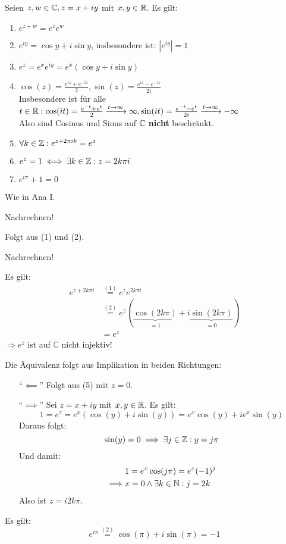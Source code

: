 \documentclass[a4paper,oneside,DIV15,BCOR12mm,chapterprefix=true,headings=onelinechapter]{scrbook}
\begin{document}
\begin{satz}
Seien $z,w\in\mathbb{C}, z=x+iy$ mit $x,y\in\mathbb{R}$. Es gilt:
\begin{enumerate}
\item $e^{z+w}=e^z e^w$
\item $e^{iy}=\cos y+i\sin y$, insbesondere ist: $|e^{iy}|=1$
\item $e^z=e^x e^{iy}=e^x(\cos y+i\sin y)$
\item $ \cos (z)=\frac{e^{iz}+e^{-iz}}{2}, \sin (z)=\frac{e^{iz}-e^{-iz}}{2i}$\\
Insbesondere ist für alle $t\in\mathbb{R}: \cos(it)=\frac{e^{-t}+e^t}{2} \xrightarrow{t \rightarrow \infty} \infty, 
\sin(it)=\frac{e^{-t}-e^t}{2i} \xrightarrow{t \rightarrow \infty} - \infty$\\
Also sind Cosinus und Sinus auf $\mathbb{C}$ \textbf{nicht} beschränkt.
\item $\forall k\in\mathbb{Z}:e^{z+2\pi i k}=e^z$
\item $e^z=1 \iff \exists k\in\mathbb{Z}:z=2k\pi i$
\item $e^{i\pi}+1=0$
\end{enumerate}
\end{satz}

\begin{beweise}
\item Wie in Ana I.
\item Nachrechnen!
\item Folgt aus (1) und (2).
\item Nachrechnen!
\item Es gilt:
\begin{align*}
e^{z+2k\pi i} &\stackrel{(1)}{=}e^ze^{2k\pi i}\\
&\stackrel{(2)}{=}e^z(\underbrace{\cos(2k\pi)}_{=1}+i\underbrace{\sin(2k\pi)}_{=0})\\
&= e^z
\end{align*}
$\Rightarrow e^z$ ist auf $\mathbb{C}$ nicht injektiv!
\item
Die Äquivalenz folgt aus Implikation in beiden Richtungen:
\begin{enumerate}
\item["`$\impliedby$"'] Folgt aus (5) mit $z=0$.
\item["`$\implies$"'] Sei $z=x+iy$ mit $x,y\in\mathbb{R}$. Es gilt:
\[1=e^z=e^x(\cos(y)+i\sin(y))=e^x\cos(y)+ie^x\sin(y)\]
Daraus folgt:
\[\sin(y)=0\implies \exists j\in\mathbb{Z}:y=j\pi\]
Und damit:
\begin{align*}
&1=e^x\cos(j\pi)=e^x(-1)^j\\
\implies &x=0\wedge\exists k\in\mathbb{N}: j=2k
\end{align*}
Also ist $z=i2k\pi$.
\end{enumerate}
\item Es gilt:
\[e^{i\pi}\stackrel{(2)}{=}\cos(\pi)+i\sin(\pi)=-1\]
\end{beweise}
\end{document}
